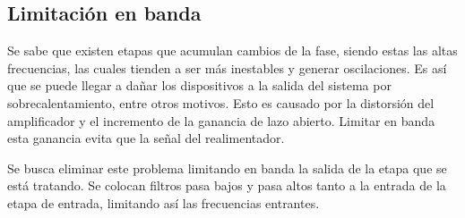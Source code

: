 
\subsection{Limitación en banda}
Se sabe que  existen etapas que acumulan cambios de la fase, siendo estas las altas frecuencias, las cuales tienden a ser más inestables y generar oscilaciones. Es así que se puede llegar a dañar los dispositivos a la salida del sistema por sobrecalentamiento, entre otros motivos. Esto es causado por la distorsión del amplificador y el incremento de la ganancia de lazo abierto. Limitar en banda esta ganancia evita que la señal del realimentador.

Se busca eliminar este problema limitando en banda la salida de la etapa que se está tratando. Se colocan filtros pasa bajos y pasa altos tanto a la entrada de la etapa de entrada, limitando así las frecuencias entrantes.

